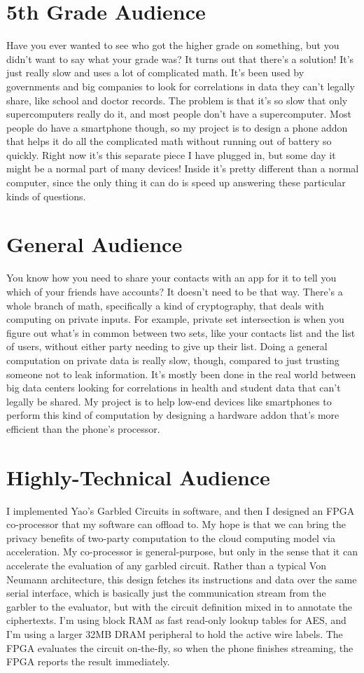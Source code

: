 \documentclass[12pt,letterpaper]{article}
\begin{document}
\section{5th Grade Audience}
Have you ever wanted to see who got the higher grade on something, but you didn't want to say what your grade was? It turns out that there's a solution! It's just really slow and uses a lot of complicated math. It's been used by governments and big companies to look for correlations in data they can't legally share, like school and doctor records. The problem is that it's so slow that only supercomputers really do it, and most people don't have a supercomputer. Most people do have a smartphone though, so my project is to design a phone addon that helps it do all the complicated math without running out of battery so quickly. Right now it's this separate piece I have plugged in, but some day it might be a normal part of many devices! Inside it's pretty different than a normal computer, since the only thing it can do is speed up answering these particular kinds of questions.

\vfill
\section{General Audience}
You know how you need to share your contacts with an app for it to tell you which of your friends have accounts? It doesn't need to be that way. There's a whole branch of math, specifically a kind of cryptography, that deals with computing on private inputs. For example, private set intersection is when you figure out what's in common between two sets, like your contacts list and the list of users, without either party needing to give up their list. Doing a general computation on private data is really slow, though, compared to just trusting someone not to leak information. It's mostly been done in the real world between big data centers looking for correlations in health and student data that can't legally be shared. My project is to help low-end devices like smartphones to perform this kind of computation by designing a hardware addon that's more efficient than the phone's processor.

\vfill
\section{Highly-Technical Audience}
I implemented Yao's Garbled Circuits in software, and then I designed an FPGA co-processor that my software can offload to. My hope is that we can bring the privacy benefits of two-party computation to the cloud computing model via acceleration. My co-processor is general-purpose, but only in the sense that it can accelerate the evaluation of any garbled circuit. Rather than a typical Von Neumann architecture, this design fetches its instructions and data over the same serial interface, which is basically just the communication stream from the garbler to the evaluator, but with the circuit definition mixed in to annotate the ciphertexts. I'm using block RAM as fast read-only lookup tables for AES, and I'm using a larger 32MB DRAM peripheral to hold the active wire labels. The FPGA evaluates the circuit on-the-fly, so when the phone finishes streaming, the FPGA reports the result immediately.
\end{document}
